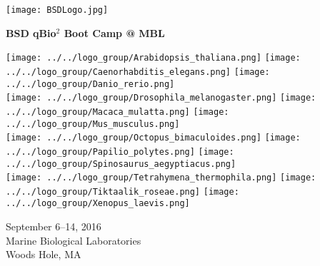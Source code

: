 \documentclass{article}
\begin{document}
\begin{centering}
\texttt{[image: BSDLogo.jpg]}

\vspace{0.11in}

\Huge{\textbf{BSD qBio$^2$ Boot Camp @ MBL}}

\vspace{0.4in}

\texttt{[image: ../../logo\_group/Arabidopsis\_thaliana.png]}
\texttt{[image: ../../logo\_group/Caenorhabditis\_elegans.png]}
\texttt{[image: ../../logo\_group/Danio\_rerio.png]}\\
\texttt{[image: ../../logo\_group/Drosophila\_melanogaster.png]}
\texttt{[image: ../../logo\_group/Macaca\_mulatta.png]}
\texttt{[image: ../../logo\_group/Mus\_musculus.png]}\\
\texttt{[image: ../../logo\_group/Octopus\_bimaculoides.png]}
\texttt{[image: ../../logo\_group/Papilio\_polytes.png]}
\texttt{[image: ../../logo\_group/Spinosaurus\_aegyptiacus.png]}\\
\texttt{[image: ../../logo\_group/Tetrahymena\_thermophila.png]}
\texttt{[image: ../../logo\_group/Tiktaalik\_roseae.png]}
\texttt{[image: ../../logo\_group/Xenopus\_laevis.png]}

\vspace{0.4in}

\Large{September 6--14, 2016}\\
\Large{Marine Biological Laboratories}\\
\Large{Woods Hole, MA}

\end{centering}
\end{document}
